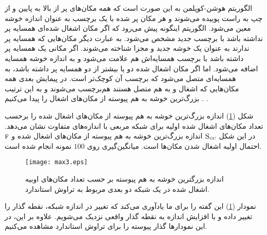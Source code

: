  الگوریتم هوشن-کوپلمن به این صورت است که همه مکان‌های پر از بالا به پایین و از چپ به راست پوییده می‌شوند و هر مکان پر شده با یک برچسب به عنوان اندازه خوشه معین می‌شود. الگوریتم اینگونه پیش می‌رود که اگر مکان اشغال شده‌ای همسایه پر نداشته باشد با برچسب جدید مشخص می‌شود. به عبارت دیگر مکان‌هایی که همسایه پر ندارند به عنوان یک خوشه جدید و مجزا شناخته می‌شوند. اگر مکانی یک همسایه پر داشته باشد با برچسب همسایه‌اش هم علامت می‌شود و به اندازه خوشه همسایه اضافه می‌شود. اما اگر مکان اشغال شده دو یا بیشتر از دو همسایه پر داشته باشد،  به همسایه‌ای متصل می‌شود که  برچسب آن کوچک‌تر است. در پیمایش بعدی همه مکان‌هایی که اشغال و به هم متصل هستند هم‌برچسب می‌شوند و به این ترتیب بزرگ‌ترین خوشه به هم پیوسته از مکان‌های اشغال را پیدا می‌کنیم \cite{hosh}. . 
 
 شکل (\ref{fig:s1}) اندازه بزرگ‌ترین خوشه به هم پیوسته از مکان‌های اشغال شده را برحسب تعداد مکان‌های اشغال شده اولیه برای شبکه مربعی با  اندازه‌های متفاوت نشان می‌دهد. در این شکل
  $\textsc{S}_{\textsc{gc}}$ 
  اندازه  بزرگ‌ترین خوشه به هم‌ پیوسته از مکان‌های اشغال شده و 
  $\textsc{f}$
   احتمال اولیه اشغال شدن مکان‌ها است. میانگین‌گیری روی $100$ نمونه انجام شده است.
 
\begin{figure} [htbp]
\centering
\texttt{[image: max3.eps]} 
\caption[اندازه بزرگترین خوشه به هم پیوسته در یک شبکه دو بعدی] {\vspace{-0.01}\footnotesize اندازه بزرگترین خوشه به هم پیوسته  بر حسب تعداد مکان‌های اوبیه اشغال شده در یک شبکه دو بعدی مربوط به تراوش استاندارد.}
\label{fig:s1}
\end{figure}
 نمودار (\ref{fig:s1}) این گفته را برای ما یادآوری می‌کند که تغییر در اندازه شبکه، نقطه گذار را تغییر داده و با افزایش اندازه به نقطه گذار واقعی  نزدیک می‌شویم. علاوه بر این، در این نمودار‌ها گذار پیوسته را برای تراوش استاندارد مشاهده می‌کنیم. 
 
